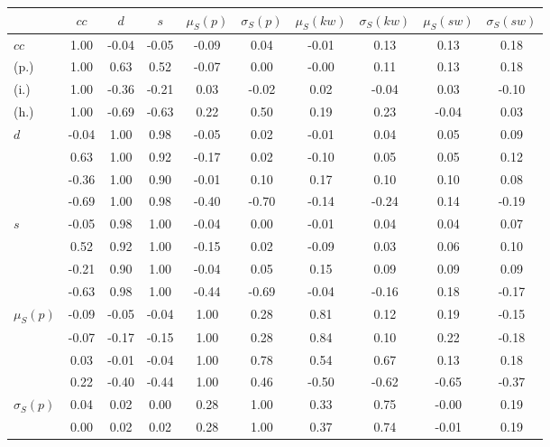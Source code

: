 \begin{table*}[h!]
\begin{center}
\begin{tabular}{| l | c | c | c | c | c | c | c | c | c |}\hline
 & $cc$ & $d$ & $s$ & $\mu_S(p)$ & $\sigma_S(p)$ & $\mu_S(kw)$ & $\sigma_S(kw)$ & $\mu_S(sw)$ & $\sigma_S(sw)$ \\\hline
$cc$ & 1.00  & -0.04  & -0.05  & -0.09  & 0.04  & -0.01  & 0.13  & 0.13  & 0.18 \\\hline
(p.) & 1.00  & 0.63  & 0.52  & -0.07  & 0.00  & -0.00  & 0.11  & 0.13  & 0.18 \\\hline
(i.) & 1.00  & -0.36  & -0.21  & 0.03  & -0.02  & 0.02  & -0.04  & 0.03  & -0.10 \\\hline
(h.) & 1.00  & -0.69  & -0.63  & 0.22  & 0.50  & 0.19  & 0.23  & -0.04  & 0.03 \\\hline
$d$ & -0.04  & 1.00  & 0.98  & -0.05  & 0.02  & -0.01  & 0.04  & 0.05  & 0.09 \\\hline
 & 0.63  & 1.00  & 0.92  & -0.17  & 0.02  & -0.10  & 0.05  & 0.05  & 0.12 \\\hline
 & -0.36  & 1.00  & 0.90  & -0.01  & 0.10  & 0.17  & 0.10  & 0.10  & 0.08 \\\hline
 & -0.69  & 1.00  & 0.98  & -0.40  & -0.70  & -0.14  & -0.24  & 0.14  & -0.19 \\\hline
$s$ & -0.05  & 0.98  & 1.00  & -0.04  & 0.00  & -0.01  & 0.04  & 0.04  & 0.07 \\\hline
 & 0.52  & 0.92  & 1.00  & -0.15  & 0.02  & -0.09  & 0.03  & 0.06  & 0.10 \\\hline
 & -0.21  & 0.90  & 1.00  & -0.04  & 0.05  & 0.15  & 0.09  & 0.09  & 0.09 \\\hline
 & -0.63  & 0.98  & 1.00  & -0.44  & -0.69  & -0.04  & -0.16  & 0.18  & -0.17 \\\hline
$\mu_S(p)$ & -0.09  & -0.05  & -0.04  & 1.00  & 0.28  & 0.81  & 0.12  & 0.19  & -0.15 \\\hline
 & -0.07  & -0.17  & -0.15  & 1.00  & 0.28  & 0.84  & 0.10  & 0.22  & -0.18 \\\hline
 & 0.03  & -0.01  & -0.04  & 1.00  & 0.78  & 0.54  & 0.67  & 0.13  & 0.18 \\\hline
 & 0.22  & -0.40  & -0.44  & 1.00  & 0.46  & -0.50  & -0.62  & -0.65  & -0.37 \\\hline
$\sigma_S(p)$ & 0.04  & 0.02  & 0.00  & 0.28  & 1.00  & 0.33  & 0.75  & -0.00  & 0.19 \\\hline
 & 0.00  & 0.02  & 0.02  & 0.28  & 1.00  & 0.37  & 0.74  & -0.01  & 0.19 \\\hline

\end{tabular}
\end{center}
\end{table*}
